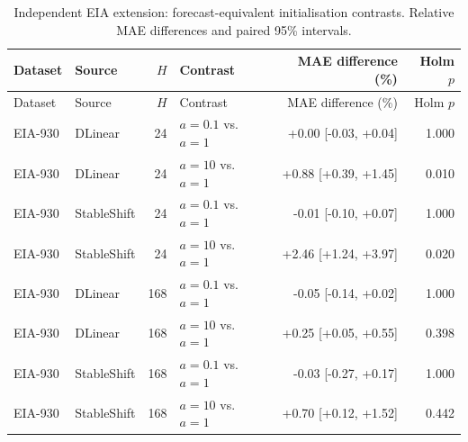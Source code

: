 \begin{longtable}{llrlrr}
\caption{Independent EIA extension: forecast-equivalent initialisation contrasts. Relative MAE differences and paired 95\% intervals.}\label{tab:independent_coordinate}\\
\toprule
Dataset & Source & $H$ & Contrast & MAE difference (\%) & Holm $p$\\
\midrule
\endfirsthead
\toprule
Dataset & Source & $H$ & Contrast & MAE difference (\%) & Holm $p$\\
\midrule
\endhead
EIA-930 & DLinear & 24 & $a=0.1$ vs. $a=1$ & +0.00 [-0.03, +0.04] & 1.000\\
EIA-930 & DLinear & 24 & $a=10$ vs. $a=1$ & +0.88 [+0.39, +1.45] & 0.010\\
EIA-930 & StableShift & 24 & $a=0.1$ vs. $a=1$ & -0.01 [-0.10, +0.07] & 1.000\\
EIA-930 & StableShift & 24 & $a=10$ vs. $a=1$ & +2.46 [+1.24, +3.97] & 0.020\\
EIA-930 & DLinear & 168 & $a=0.1$ vs. $a=1$ & -0.05 [-0.14, +0.02] & 1.000\\
EIA-930 & DLinear & 168 & $a=10$ vs. $a=1$ & +0.25 [+0.05, +0.55] & 0.398\\
EIA-930 & StableShift & 168 & $a=0.1$ vs. $a=1$ & -0.03 [-0.27, +0.17] & 1.000\\
EIA-930 & StableShift & 168 & $a=10$ vs. $a=1$ & +0.70 [+0.12, +1.52] & 0.442\\
\bottomrule
\end{longtable}